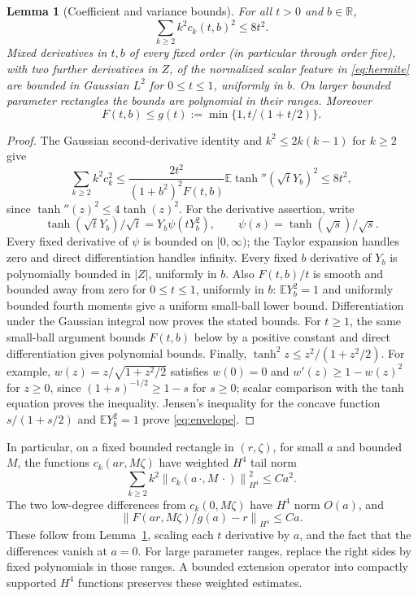 \documentclass[11pt]{article}
\newtheorem{lemma}[theorem]{Lemma}
\theoremstyle{remark}\newtheorem{remark}[theorem]{Remark}
\newcommand{\R}{\mathbb R}
\newcommand{\E}{\mathbb E}
\newcommand{\norm}[1]{\left\lVert #1\right\rVert}
\begin{document}
\begin{lemma}[Coefficient and variance bounds]\label{lem:coefficients}
For all $t>0$ and $b\in\R$,
\begin{equation}\label{eq:weightedtail}
 \sum_{k\ge2}k^2c_k(t,b)^2\le8t^2.
\end{equation}
Mixed derivatives in $t,b$ of every fixed order (in particular through
order five), with two further derivatives in $Z$, of the normalized scalar feature in
\eqref{eq:hermite} are bounded in Gaussian $L^2$ for $0\le t\le1$,
uniformly in $b$. On larger bounded parameter rectangles the bounds are
polynomial in their ranges. Moreover
\begin{equation}\label{eq:envelope}
 F(t,b)\le g(t):=\min\{1,t/(1+t/2)\}.
\end{equation}
\end{lemma}
\begin{proof}
The Gaussian second-derivative identity and $k^2\le2k(k-1)$ for $k\ge2$
give
\[
 \sum_{k\ge2}k^2c_k^2
 \le\frac{2t^2}{(1+b^2)^2 F(t,b)}
             \E\tanh''(\sqrt tY_b)^2\le8t^2,
\]
since $\tanh''(z)^2\le4\tanh(z)^2$.
For the derivative assertion, write
\[
 \tanh(\sqrt tY_b)/\sqrt t=Y_b\psi(tY_b^2),
 \qquad\psi(s)=\tanh(\sqrt s)/\sqrt s.
\]
Every fixed derivative of $\psi$ is bounded on $[0,\infty)$; the Taylor
expansion handles zero and direct differentiation handles infinity.
Every fixed $b$ derivative of $Y_b$ is polynomially bounded in $|Z|$,
uniformly in $b$. Also $F(t,b)/t$ is smooth and bounded away from zero for
$0\le t\le1$, uniformly in $b$: $\E Y_b^2=1$ and uniformly bounded fourth
moments give a uniform small-ball lower bound. Differentiation under the
Gaussian integral now proves the stated bounds. For $t\ge1$, the same
small-ball argument bounds $F(t,b)$ below by a positive constant and
direct differentiation gives polynomial bounds. Finally,
$\tanh^2 z\le z^2/(1+z^2/2)$. For example,
$w(z)=z/\sqrt{1+z^2/2}$ satisfies $w(0)=0$ and
$w'(z)\ge1-w(z)^2$ for $z\ge0$, since
$(1+s)^{-1/2}\ge1-s$ for $s\ge0$; scalar comparison with the tanh
equation proves the inequality. Jensen's inequality for the concave function
$s/(1+s/2)$ and $\E Y_b^2=1$ prove \eqref{eq:envelope}.
\end{proof}

In particular, on a fixed bounded rectangle in $(r,\zeta)$, for small
$a$ and bounded $M$, the functions $c_k(ar,M\zeta)$ have weighted
$H^4$ tail norm
\begin{equation}\label{eq:sobolevtail}
 \sum_{k\ge2}k^2\norm{c_k(a\,\cdot,M\,\cdot)}_{H^4}^2\le Ca^2.
\end{equation}
The two low-degree differences from $c_k(0,M\zeta)$ have $H^4$ norm
$O(a)$, and
\begin{equation}\label{eq:rresidual}
 \norm{F(a r,M\zeta)/g(a)-r}_{H^4}\le Ca.
\end{equation}
These follow from Lemma~\ref{lem:coefficients}, scaling each $t$ derivative
by $a$, and the fact that the differences vanish at $a=0$. For large
parameter ranges, replace the right sides by fixed polynomials in those
ranges. A bounded extension operator into compactly supported $H^4$
functions preserves these weighted estimates.
\end{document}
